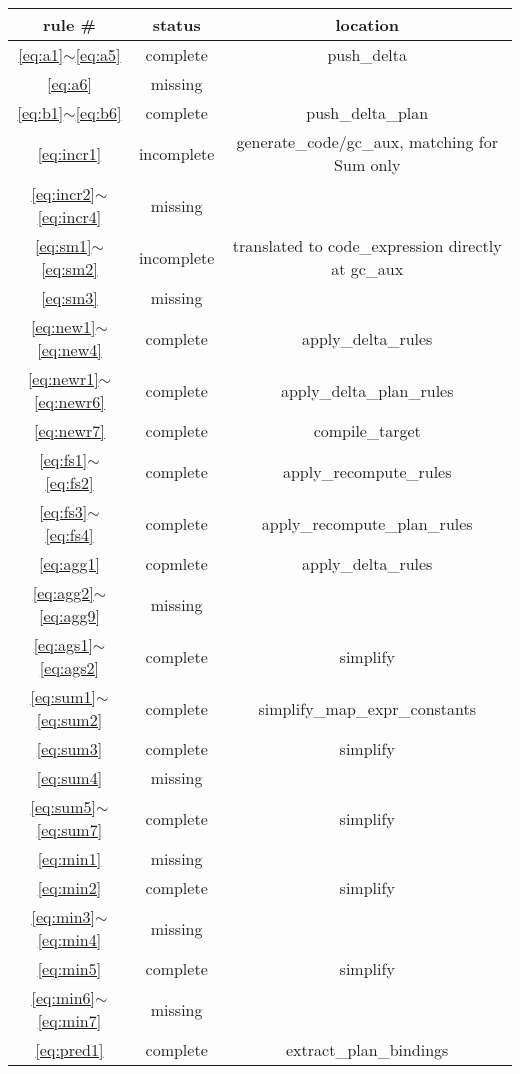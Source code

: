 \documentclass{article}
\begin{document}
\begin{tabular} {|c|c|c|}
\hline rule \# & status & location  \\
\hline \ref{eq:a1}$\sim$\ref{eq:a5} & complete & push\_delta \\
\hline \ref{eq:a6} & missing & \\
\hline \ref{eq:b1}$\sim$\ref{eq:b6} & complete & push\_delta\_plan\\
\hline \ref{eq:incr1} & incomplete & generate\_code/gc\_aux, matching for Sum only\\
\hline \ref{eq:incr2}$\sim$\ref{eq:incr4} & missing & \\
\hline \ref{eq:sm1}$\sim$\ref{eq:sm2} & incomplete & translated to code\_expression directly at gc\_aux\\
\hline \ref{eq:sm3} & missing & \\
\hline \ref{eq:new1}$\sim$\ref{eq:new4} & complete & apply\_delta\_rules\\
\hline \ref{eq:newr1}$\sim$\ref{eq:newr6} & complete & apply\_delta\_plan\_rules\\
\hline \ref{eq:newr7} & complete & compile\_target\\
\hline \ref{eq:fs1}$\sim$\ref{eq:fs2} & complete & apply\_recompute\_rules\\
\hline \ref{eq:fs3}$\sim$\ref{eq:fs4} & complete & apply\_recompute\_plan\_rules\\
\hline \ref{eq:agg1} & copmlete & apply\_delta\_rules\\
\hline \ref{eq:agg2}$\sim$\ref{eq:agg9} & missing & \\
\hline \ref{eq:ags1}$\sim$\ref{eq:ags2} & complete & simplify \\
\hline \ref{eq:sum1}$\sim$\ref{eq:sum2} & complete & simplify\_map\_expr\_constants \\
\hline \ref{eq:sum3} & complete & simplify \\
\hline \ref{eq:sum4} & missing & \\
\hline \ref{eq:sum5}$\sim$\ref{eq:sum7} & complete & simplify \\
\hline \ref{eq:min1} & missing & \\
\hline \ref{eq:min2}& complete & simplify \\
\hline \ref{eq:min3}$\sim$\ref{eq:min4} & missing & \\
\hline \ref{eq:min5} & complete & simplify \\
\hline \ref{eq:min6}$\sim$\ref{eq:min7} & missing & \\
\hline \ref{eq:pred1} & complete & extract\_plan\_bindings\\

\end{tabular}
\end{document}
